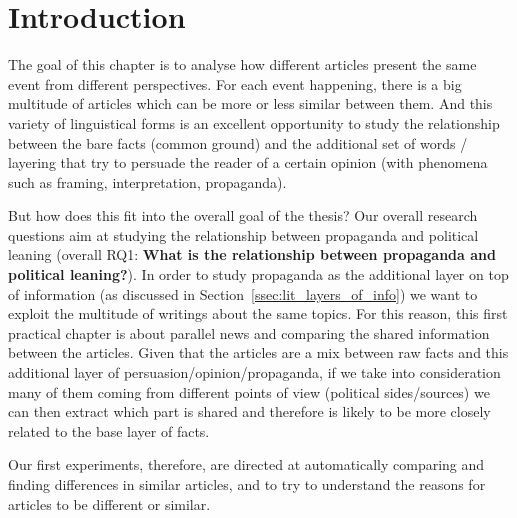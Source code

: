 \section{Introduction}



The goal of this chapter is to analyse how different articles present the same event from different perspectives. For each event happening, there is a big multitude of articles which can be more or less similar between them.
And this variety of linguistical forms is an excellent opportunity to study the relationship between the bare facts (common ground) and the additional set of words / layering that try to persuade the reader of a certain opinion (with phenomena such as framing, interpretation, propaganda).

But how does this fit into the overall goal of the thesis? Our overall research questions aim at studying the relationship between propaganda and political leaning (overall RQ1: \textbf{What is the relationship between propaganda and political leaning?}).
In order to study propaganda as the additional layer on top of information
(as discussed in Section~\ref{ssec:lit_layers_of_info})
we want to exploit the multitude of writings about the same topics. For this reason, this first practical chapter is about parallel news and comparing the shared information between the articles.
Given that the articles are a mix between raw facts and this additional layer of persuasion/opinion/propaganda, if we take into consideration many of them coming from different points of view (political sides/sources) we can then extract which part is shared and therefore is likely to be more closely related to the base layer of facts. 

Our first experiments, therefore, are directed at automatically comparing and finding differences in similar articles, and to try to understand the reasons for articles to be different or similar.

